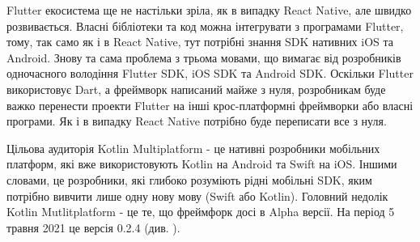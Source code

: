Flutter екосистема ще не настільки зріла, як в випадку React Native, але швидко розвивається.
Власні бібліотеки та код можна інтегрувати з програмами Flutter, тому, так само як і в React Native,
тут потрібні знання SDK нативних iOS та Android.
Знову та сама проблема з трьома мовами, що вимагає від розробників одночасного володіння Flutter SDK, iOS SDK та Android SDK.
Оскільки Flutter використовує Dart, а фреймворк написаний майже з нуля,
розробникам буде важко перенести проекти Flutter на інші крос-платформні фреймворки або власні програми.
Як і в випадку React Native потрібно буде переписати все з нуля.

Цільова аудиторія Kotlin Multiplatform - це нативні розробники мобільних платформ, які вже використовують Kotlin на Android та Swift на iOS.
Іншими словами, це розробники, які глибоко розуміють рідні мобільні SDK, яким потрібно вивчити лише одну нову мову (Swift або Kotlin).
Головний недолік Kotlin Mutlitplatform - це те, що фреймфорк досі в Alpha версії. На період 5 травня 2021 це версія 0.2.4 (див. \cite{kmm_plugin_releases}).

